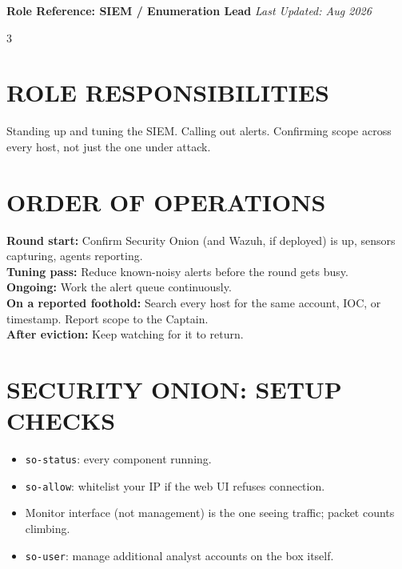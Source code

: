 \documentclass[7pt,landscape]{article}
\begin{document}
\textbf{Role Reference: SIEM / Enumeration Lead} \hfill \textit{Last Updated: Aug 2026}
\raggedcolumns
\begin{multicols*}{3}

\section{ROLE RESPONSIBILITIES}
Standing up and tuning the SIEM. Calling out alerts. Confirming scope across every host, not just the one under attack.

\section{ORDER OF OPERATIONS}
\textbf{Round start:} Confirm Security Onion (and Wazuh, if deployed) is up, sensors capturing, agents reporting. \\
\textbf{Tuning pass:} Reduce known-noisy alerts before the round gets busy. \\
\textbf{Ongoing:} Work the alert queue continuously. \\
\textbf{On a reported foothold:} Search every host for the same account, IOC, or timestamp. Report scope to the Captain. \\
\textbf{After eviction:} Keep watching for it to return.

\section{SECURITY ONION: SETUP CHECKS}
\begin{itemize}
    \item \texttt{so-status}: every component running.
    \item \texttt{so-allow}: whitelist your IP if the web UI refuses connection.
    \item Monitor interface (not management) is the one seeing traffic; packet counts climbing.
    \item \texttt{so-user}: manage additional analyst accounts on the box itself.
\end{itemize}


\end{multicols*}
\end{document}
